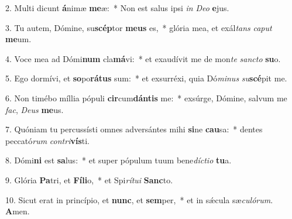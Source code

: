 2. Multi dicunt \textbf{á}nimæ \textbf{me}æ:~*  Non est salus ipsi \textit{in} \textit{De}\textit{o} \textbf{e}jus.\

3. Tu autem, Dómine, su\textbf{scép}tor \textbf{me}\textbf{us} es,~*  glória mea, et exál\textit{tans} \textit{ca}\textit{put} \textbf{me}um.\

4. Voce mea ad Dómi\textbf{num} cla\textbf{má}vi:~*  et exaudívit me de mon\textit{te} \textit{sanc}\textit{to} \textbf{su}o.\

5. Ego dormívi, et \textbf{so}po\textbf{rá}\textbf{tus} sum:~*  et exsurréxi, quia Dó\textit{mi}\textit{nus} \textit{su}\textbf{scé}pit me.\

6. Non timébo míllia pópuli \textbf{cir}cum\textbf{dán}\textbf{tis} me:~*  exsúrge, Dómine, salvum me \textit{fac}, \textit{De}\textit{us} \textbf{me}us.\

7. Quóniam tu percussísti omnes adversántes mihi \textbf{si}ne \textbf{cau}sa:~*  dentes peccató\textit{rum} \textit{con}\textit{tri}\textbf{vís}ti.\

8. Dómi\textbf{ni} est \textbf{sa}lus:~*  et super pópulum tuum bene\textit{díc}\textit{ti}\textit{o} \textbf{tu}a.\

9. Glória \textbf{Pa}tri, et \textbf{Fí}\textbf{li}o,~*  et Spi\textit{rí}\textit{tu}\textit{i} \textbf{Sanc}to.\

10. Sicut erat in princípio, et \textbf{nunc}, et \textbf{sem}per,~*  et in sǽcula sæ\textit{cu}\textit{ló}\textit{rum}. \textbf{A}men.\


